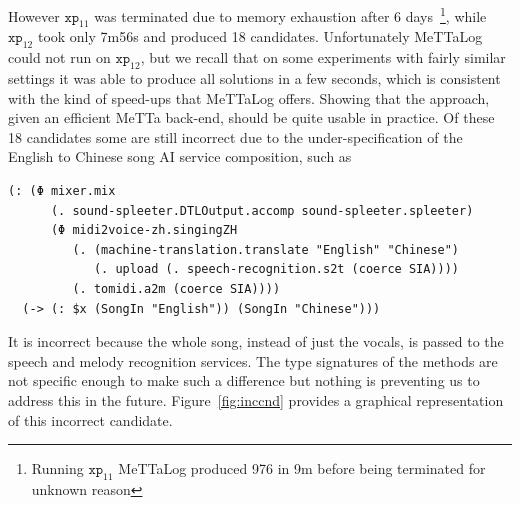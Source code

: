 \documentclass[]{report}
\begin{document}
However $\texttt{xp}_{11}$ was terminated due to memory exhaustion
after 6 days~\footnote{Running $\texttt{xp}_{11}$ MeTTaLog produced
976 in 9m before being terminated for unknown reason}, while
$\texttt{xp}_{12}$ took only 7m56s and produced 18 candidates.
Unfortunately MeTTaLog could not run on $\texttt{xp}_{12}$, but we
recall that on some experiments with fairly similar settings it was
able to produce all solutions in a few seconds, which is consistent
with the kind of speed-ups that MeTTaLog offers.  Showing that the
approach, given an efficient MeTTa back-end, should be quite usable in
practice.  Of these 18 candidates some are still incorrect due to the
under-specification of the English to Chinese song AI service
composition, such as
\begin{small}
\begin{verbatim}
(: (Φ mixer.mix
      (. sound-spleeter.DTLOutput.accomp sound-spleeter.spleeter)
      (Φ midi2voice-zh.singingZH
         (. (machine-translation.translate "English" "Chinese")
            (. upload (. speech-recognition.s2t (coerce SIA))))
         (. tomidi.a2m (coerce SIA))))
  (-> (: $x (SongIn "English")) (SongIn "Chinese")))
\end{verbatim}
\end{small}
It is incorrect because the whole song, instead of just the vocals, is
passed to the speech and melody recognition services.  The type
signatures of the methods are not specific enough to make such a
difference but nothing is preventing us to address this in the future.
Figure~\ref{fig:inccnd} provides a graphical representation of this
incorrect candidate.
\end{document}
